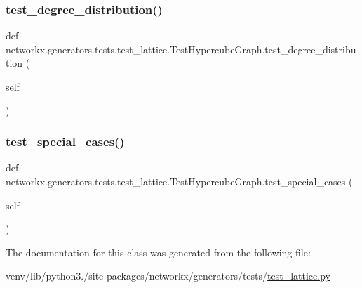 \subsubsection{\texorpdfstring{test\+\_\+degree\+\_\+distribution()}{test\_degree\_distribution()}}
{\footnotesize\ttfamily def networkx.\+generators.\+tests.\+test\+\_\+lattice.\+Test\+Hypercube\+Graph.\+test\+\_\+degree\+\_\+distribution (\begin{DoxyParamCaption}\item[{}]{self }\end{DoxyParamCaption})}

\mbox{\label{classnetworkx_1_1generators_1_1tests_1_1test__lattice_1_1TestHypercubeGraph_ae99e9079ba0fc5f7a9d1c8e7bdfc20ca}} 
\subsubsection{\texorpdfstring{test\+\_\+special\+\_\+cases()}{test\_special\_cases()}}
{\footnotesize\ttfamily def networkx.\+generators.\+tests.\+test\+\_\+lattice.\+Test\+Hypercube\+Graph.\+test\+\_\+special\+\_\+cases (\begin{DoxyParamCaption}\item[{}]{self }\end{DoxyParamCaption})}



The documentation for this class was generated from the following file\+:\begin{DoxyCompactItemize}
\item 
venv/lib/python3./site-\/packages/networkx/generators/tests/\hyperlink{test__lattice_8py}{test\+\_\+lattice.\+py}\end{DoxyCompactItemize}
